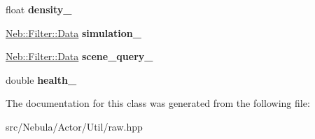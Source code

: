 \begin{DoxyCompactItemize}
\item 
\hypertarget{classNeb_1_1Actor_1_1raw_a6f591c6a187022df38c021935f37652b}{float {\bfseries density\-\_\-}}\label{classNeb_1_1Actor_1_1raw_a6f591c6a187022df38c021935f37652b}

\item 
\hypertarget{classNeb_1_1Actor_1_1raw_a98277053503abc934fc98d68695ec5ce}{\hyperlink{classNeb_1_1Filter_1_1Data}{\-Neb\-::\-Filter\-::\-Data} {\bfseries simulation\-\_\-}}\label{classNeb_1_1Actor_1_1raw_a98277053503abc934fc98d68695ec5ce}

\item 
\hypertarget{classNeb_1_1Actor_1_1raw_a10f21229110140a267883a7fc63b5d07}{\hyperlink{classNeb_1_1Filter_1_1Data}{\-Neb\-::\-Filter\-::\-Data} {\bfseries scene\-\_\-query\-\_\-}}\label{classNeb_1_1Actor_1_1raw_a10f21229110140a267883a7fc63b5d07}

\item 
\hypertarget{classNeb_1_1Actor_1_1raw_abb0ceda216754540205cf588df29b9ba}{double {\bfseries health\-\_\-}}\label{classNeb_1_1Actor_1_1raw_abb0ceda216754540205cf588df29b9ba}

\end{DoxyCompactItemize}


\-The documentation for this class was generated from the following file\-:\begin{DoxyCompactItemize}
\item 
src/\-Nebula/\-Actor/\-Util/raw.\-hpp\end{DoxyCompactItemize}
